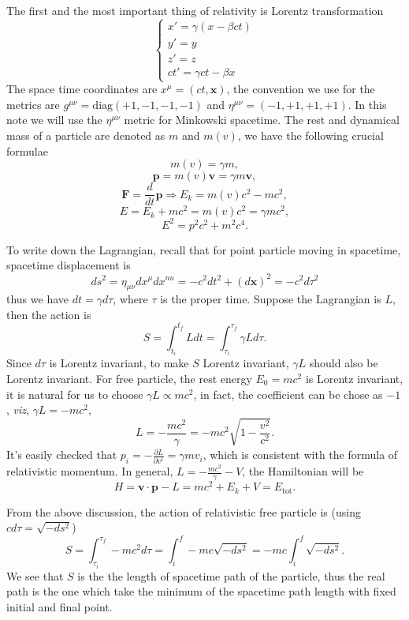 \documentclass[graybox,envcountchap,sectrefs]{svmono}
\begin{document}
The first and the most important thing of relativity is Lorentz transformation
\begin{equation}
\begin{cases}
x'=\gamma(x-\beta ct)\\
y'=y\\
z'=z\\
ct'=\gamma{ct-\beta x}
\end{cases}
\end{equation}
The space time coordinates are $x^{\mu}=(ct,\mathbf{x})$, the convention we use for the metrics are $g^{\mu\nu}=\mathrm{diag}(+1,-1,-1,-1)$ and $\eta^{\mu\nu}=(-1,+1,+1,+1)$. In this note we will use the $\eta^{\mu\nu}$ metric for Minkowski spacetime.
The rest and dynamical mass of a particle are denoted as $m$ and $m(v)$, we have the following crucial formulae
\[ m(v)=\gamma m,\]
\[ \mathbf{p}=m(v)\mathbf{v}=\gamma m \mathbf{v},\]
\[\mathbf{F}=\frac{d}{dt}\mathbf{p}\Rightarrow E_k=m(v)c^2-mc^2, \]
\[E=E_k+mc^2=m(v)c^2=\gamma mc^2,\]
\[E^2=p^2c^2+m^2c^4.\]

To write down the Lagrangian, recall that for point particle moving in spacetime, spacetime displacement is
$$ds^2=\eta_{\mu\nu}dx^{\mu}dx^{nu}=-c^2dt^2+(d\mathbf{x})^2=-c^2d\tau^2$$
thus we have $dt=\gamma d\tau$, where $\tau$ is the proper time. Suppose the Lagrangian is $L$, then the action is 
\begin{equation}
S=\int_{t_i}^{t_f}Ldt=\int_{\tau_i}^{\tau_f}\gamma Ld\tau.
\end{equation}
Since $d\tau$ is Lorentz invariant, to make $S$ Lorentz invariant, $\gamma L$ should also be Lorentz invariant. 
For free particle, the rest energy $E_0=mc^2$ is Lorentz invariant, it is natural for us to choose $\gamma L \propto mc^2$, in fact, the coefficient can be chose as $-1$, \emph{viz}, $\gamma L=-mc^2$,
\begin{equation}
L=-\frac{mc^2}{\gamma}=-mc^2\sqrt{1-\frac{v^2}{c^2}}.
\end{equation}
It's easily checked that $p_i=-\frac{\partial L}{\partial v^i}=\gamma m v_i$, which is consistent with the formula of relativistic momentum. In general, $L=-\frac{mc^2}{\gamma}-V$, the Hamiltonian will be
\[H=\mathbf{v}\cdot \mathbf{p}-L=mc^2+E_k+V=E_{\mathrm{tot}}.\]

From the above discussion, the action of relativistic free particle is (using $cd\tau=\sqrt{-ds^2}$)
\begin{equation}
S=\int_{\tau_i}^{\tau_f}-mc^2d\tau=\int_{i}^f-mc \sqrt{-d s^2}=-mc\int_{i}^f \sqrt{-d s^2}.
\end{equation}
We see that $S$ is the the length of spacetime path of the particle, thus the real path is the one which take the minimum of the spacetime path length with fixed initial and final point.
\end{document}
